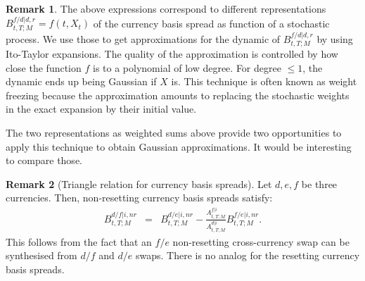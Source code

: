 \documentclass[11pt,english]{amsart}
\theoremstyle{definition}
\newtheorem{rema}{Remark}
\begin{document}
\begin{rema}
The above expressions correspond to different representations $B^{f/d|d,r}_{t,T;M} = f(t,X_t)$ of the currency basis spread as function of a stochastic process. We use those to get approximations for the dynamic of $B^{f/d|d,r}_{t,T;M}$ by using Ito-Taylor expansions. The quality of the approximation is controlled by how close the function $f$ is to a polynomial of low degree. For degree $\le 1$, the dynamic ends up being Gaussian if $X$ is. This technique is often known as weight freezing because the approximation amounts to replacing the stochastic weights in the exact expansion by their initial value.

The two representations as weighted sums above provide two opportunities to apply this technique to obtain Gaussian approximations. It would be interesting to compare those. 
\end{rema}






\begin{rema}[Triangle relation for currency basis spreads]
Let $d,e,f$ be three currencies. Then, non-resetting currency basis spreads satisfy:
\begin{eqnarray}
   B^{d/f|i,nr}_{t,T;M} &=& B^{d/e|i,nr}_{t,T;M} - \frac{A^{f|i}_{t,T;M}}{A^{d|i}_{t,T;M}} B^{f/e|i,nr}_{t,T;M}    .
\end{eqnarray}
This follows from the fact that an $f/e$ non-resetting cross-currency swap can be synthesised from $d/f$ and $d/e$ swaps. There is no analog for the resetting currency basis spreads.
\end{rema}
\end{document}
